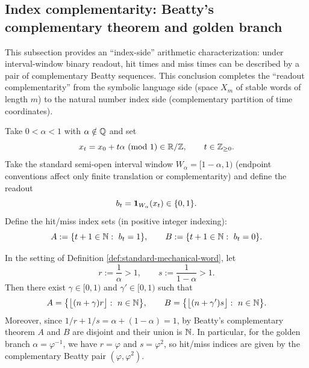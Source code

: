 \subsection{Index complementarity: Beatty's complementary theorem and golden branch}\label{subsec:beatty-complement}

This subsection provides an ``index-side'' arithmetic characterization: under interval-window binary readout, hit times and miss times can be described by a pair of complementary Beatty sequences. This conclusion completes the ``readout complementarity'' from the symbolic language side (space $X_m$ of stable words of length $m$) to the natural number index side (complementary partition of time coordinates).

\begin{definition}\label{def:standard-mechanical-word}
Take $0<\alpha<1$ with $\alpha\notin\mathbb{Q}$ and set
\[
x_t=x_0+t\alpha\ (\mathrm{mod}\ 1)\in\RR/\ZZ,\qquad t\in\ZZ_{\ge 0}.
\]
Take the standard semi-open interval window $W_\alpha=[1-\alpha,1)$ (endpoint conventions affect only finite translation or complementarity) and define the readout
\[
b_t=\mathbf{1}_{W_\alpha}(x_t)\in\{0,1\}.
\]
Define the hit/miss index sets (in positive integer indexing):
\[
A:=\{t+1\in\NN:\ b_t=1\},\qquad B:=\{t+1\in\NN:\ b_t=0\}.
\]
\end{definition}

\begin{proposition}\label{prop:beatty-complement-indices}
In the setting of Definition \ref{def:standard-mechanical-word}, let
\[
r:=\frac{1}{\alpha}>1,\qquad s:=\frac{1}{1-\alpha}>1.
\]
Then there exist $\gamma\in[0,1)$ and $\gamma'\in[0,1)$ such that
\[
A=\big\{\big\lfloor (n+\gamma)r\big\rfloor:\ n\in\mathbb{N}\big\},\qquad
B=\big\{\big\lfloor (n+\gamma')s\big\rfloor:\ n\in\mathbb{N}\big\}.
\]
Moreover, since $1/r+1/s=\alpha+(1-\alpha)=1$, by Beatty's complementary theorem $A$ and $B$ are disjoint and their union is $\mathbb{N}$. In particular, for the golden branch $\alpha=\varphi^{-1}$, we have $r=\varphi$ and $s=\varphi^{2}$, so hit/miss indices are given by the complementary Beatty pair $(\varphi,\varphi^2)$.\cite{Beatty1926}
\end{proposition}

